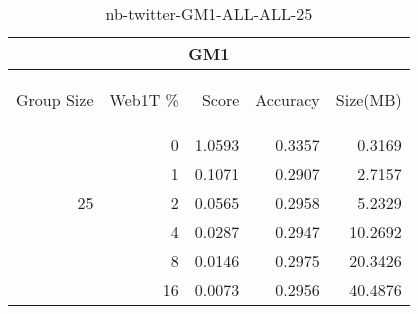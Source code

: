 \begin{center}
\begin{table}[htbp] 
 \begin{center}
\begin{tabular}{ | r | r | r | r | r |}
\hline
\multicolumn{5}{|c|}{GM1}\\
\hline
\begin{sideways}Group Size\end{sideways} & \begin{sideways}Web1T \%\end{sideways} & \begin{sideways}Score\end{sideways} & \begin{sideways}Accuracy\end{sideways} & \begin{sideways}Size(MB)\end{sideways}\\
\hline
\multirow{5}{*}{25}
 & 0 & 1.0593 & 0.3357 & 0.3169\\ \cline{2-5}
 & 1 & 0.1071 & 0.2907 & 2.7157\\ \cline{2-5}
 & 2 & 0.0565 & 0.2958 & 5.2329\\ \cline{2-5}
 & 4 & 0.0287 & 0.2947 & 10.2692\\ \cline{2-5}
 & 8 & 0.0146 & 0.2975 & 20.3426\\ \cline{2-5}
 & 16 & 0.0073 & 0.2956 & 40.4876\\ \cline{2-5}
\hline
\end{tabular}
\caption{nb-twitter-GM1-ALL-ALL-25}
\label{table:nb-twitter-GM1-ALL-ALL-25}
\end{center}
 \end{table}
\end{center}

